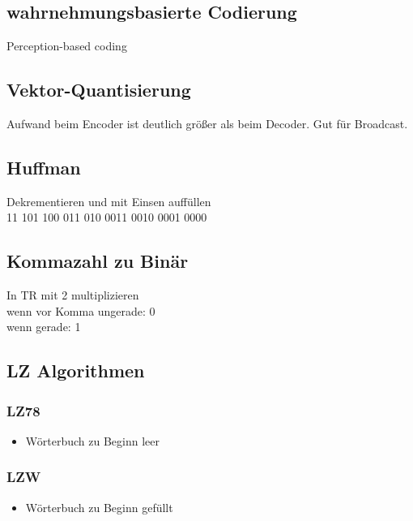\begin{multicols}{2}
\subsection*{wahrnehmungsbasierte Codierung}
Perception-based coding

\subsection*{Vektor-Quantisierung}
Aufwand beim Encoder ist deutlich größer als beim Decoder. Gut für Broadcast.

\subsection*{Huffman}
Dekrementieren und mit Einsen auffüllen\\
11 101 100 011 010 0011 0010 0001 0000

\subsection*{Kommazahl zu Binär}
\begin{minipage}{\columnwidth}
In TR mit 2 multiplizieren\\
wenn vor Komma ungerade: 0\\
wenn gerade: 1
\end{minipage}

\subsection*{LZ Algorithmen}
\begin{minipage}{\columnwidth}
    \subsubsection*{LZ78}
    \begin{itemize}
        \setlength{\parskip}{0pt}
        \setlength{\itemsep}{0pt plus 1pt}
        \item Wörterbuch zu Beginn leer
    \end{itemize}
    \subsubsection*{LZW}
    \begin{itemize}
        \setlength{\parskip}{0pt}
        \setlength{\itemsep}{0pt plus 1pt}
        \item Wörterbuch zu Beginn gefüllt
    \end{itemize}
\end{minipage}

\end{multicols}